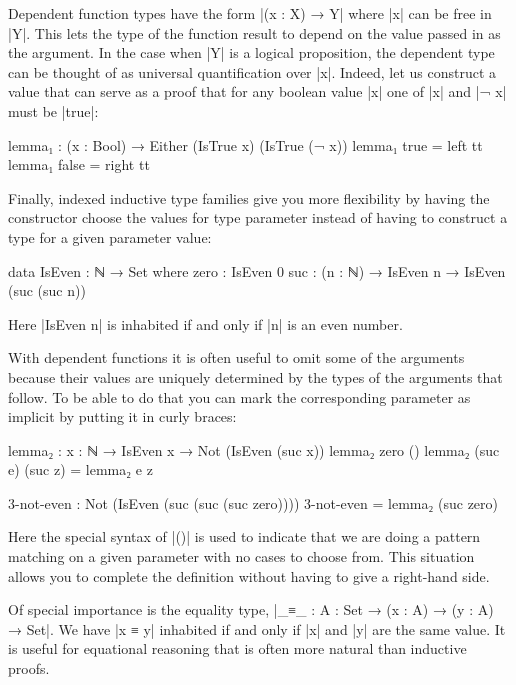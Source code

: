 Dependent function types have the form |(x : X) → Y| where |x| can be free in |Y|. 
This lets the type of the function result to depend on the value passed in as the argument.
In the case when |Y| is a logical proposition, the dependent type can be thought of as universal quantification over |x|.
Indeed, let us construct a value that can serve as a proof that for 
any boolean value |x| one of |x| and |¬ x| must be |true|:

\begin{code}
lemma₁ : (x : Bool) → Either (IsTrue x) (IsTrue (¬ x))
lemma₁ true = left tt
lemma₁ false = right tt
\begin{code}

Finally, indexed inductive type families give you more flexibility by having the constructor choose the values for type parameter
instead of having to construct a type for a given parameter value:

\begin{code}
data IsEven : ℕ → Set where
  zero : IsEven 0
  suc : (n : ℕ) → IsEven n → IsEven (suc (suc n))
\end{code}

Here |IsEven n| is inhabited if and only if |n| is an even number.

With dependent functions it is often useful to omit some of the arguments because their values are uniquely 
determined by the types of the arguments that follow. To be able to do that you can mark the corresponding
parameter as implicit by putting it in curly braces:

\begin{code}
  lemma₂ : {x : ℕ} → IsEven x → Not (IsEven (suc x))
  lemma₂ zero () 
  lemma₂ (suc e) (suc z) = lemma₂ e z

  3-not-even : Not (IsEven (suc (suc (suc zero))))
  3-not-even = lemma₂ (suc zero)
\end{code}

Here the special syntax of |()| is used to indicate that we are doing a pattern matching on a given parameter with no cases to choose from.
This situation allows you to complete the definition without having to give a right-hand side.

Of special importance is the equality type, |_≡_ : {A : Set} → (x : A) → (y : A) → Set|. We have |x ≡ y| inhabited if and only if |x| and |y|
are the same value. It is useful for equational reasoning that is often more natural than inductive proofs.


\end{code}
\end{code}
